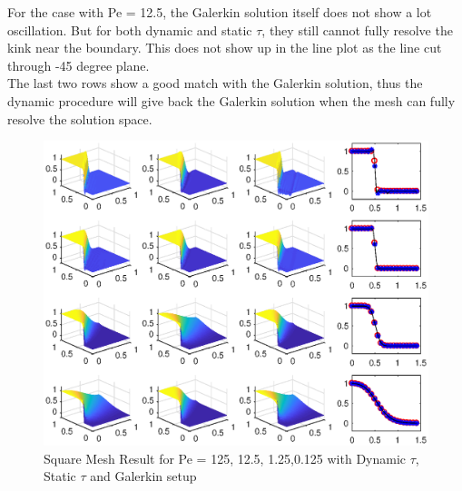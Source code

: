 \documentclass[10pt]{article}
\begin{document}
For the case with Pe = 12.5, the Galerkin solution itself does not show a lot oscillation. But for both dynamic and static $\tau$, they still cannot fully resolve the kink near the boundary. This does not show up in the line plot as the line cut through -45 degree plane. \\
The last two rows show a good match with the Galerkin solution, thus the dynamic procedure will give back the Galerkin solution when the mesh can fully resolve the solution space.
\begin{figure}[h!]
	\begin{center}
	\includegraphics[width=1.0\textwidth, clip]{./figure/SQmesh.eps}
	\end{center}
		\vspace{0mm}
    \caption{Square Mesh Result for Pe = 125, 12.5, 1.25,0.125 with Dynamic $\tau$, Static $\tau$ and Galerkin setup}
  	\label{SQ}
\end{figure}
\end{document}
